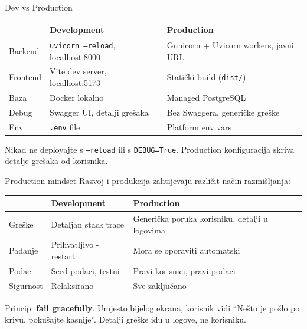\begin{frame}{Dev vs Production}
\begin{tabular}{@{}lp{5cm}p{5cm}@{}}
  \toprule
  & \textbf{Development} & \textbf{Production} \\
  \midrule
  Backend & \texttt{uvicorn --reload}, localhost:8000 & Gunicorn + Uvicorn workers, javni URL \\
  Frontend & Vite dev server, localhost:5173 & Statički build (\texttt{dist/}) \\
  Baza & Docker lokalno & Managed PostgreSQL \\
  Debug & Swagger UI, detalji grešaka & Bez Swaggera, generičke greške \\
  Env & \texttt{.env} file & Platform env vars \\
  \bottomrule
\end{tabular}

\vspace{0.6em}
Nikad ne deployajte s \texttt{--reload} ili s \texttt{DEBUG=True}. Production konfiguracija skriva detalje grešaka od korisnika.
\end{frame}

\begin{frame}{Production mindset}
Razvoj i produkcija zahtijevaju različit način razmišljanja:

\vspace{0.4em}
\begin{tabular}{@{}lp{5cm}p{5cm}@{}}
  \toprule
  & \textbf{Development} & \textbf{Production} \\
  \midrule
  Greške & Detaljan stack trace & Generička poruka korisniku, detalji u logovima \\
  Padanje & Prihvatljivo - restart & Mora se oporaviti automatski \\
  Podaci & Seed podaci, testni & Pravi korisnici, pravi podaci \\
  Sigurnost & Relaksirano & Sve zaključano \\
  \bottomrule
\end{tabular}

\vspace{0.6em}
Princip: \textbf{fail gracefully}. Umjesto bijelog ekrana, korisnik vidi \enquote{Nešto je pošlo po krivu, pokušajte kasnije}. Detalji greške idu u logove, ne korisniku.
\end{frame}

